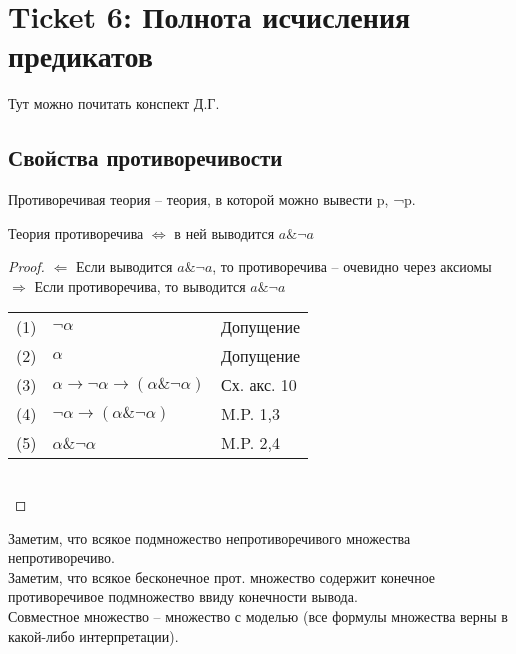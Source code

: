 \section{Ticket 6: Полнота исчисления предикатов}
\label{sec-8}
Тут можно почитать конспект Д.Г.
\subsection{Свойства противоречивости}
\label{sec-8-1}
Противоречивая теория – теория, в которой можно вывести p, ¬p.
\begin{lemma}
Теория противоречива $\Leftrightarrow$ в ней выводится $a \& \neg a$
\end{lemma}
\begin{proof}
$\Leftarrow$ Если выводится $a \& \neg a$, то противоречива -- очевидно через аксиомы\\
$\Rightarrow$ Если противоречива, то выводится $a \& \neg a$\\
\begin{tabular}{lll}
(1)& $\neg \alpha$& Допущение\\
(2)& $\alpha$& Допущение\\
(3)& $\alpha \to \neg \alpha \to (\alpha \& \neg \alpha)$& Сх. акс. 10\\
(4)& $\neg \alpha \to (\alpha \& \neg \alpha)$& M.P. 1,3\\
(5)& $\alpha \& \neg \alpha$& M.P. 2,4\\
\end{tabular}\\
\end{proof}
Заметим, что всякое подмножество непротиворечивого множества непротиворечиво.\\
Заметим, что всякое бесконечное прот. множество содержит конечное противоречивое подмножество ввиду конечности вывода.\\
Совместное множество – множество с моделью (все формулы множества верны в какой-либо интерпретации).
